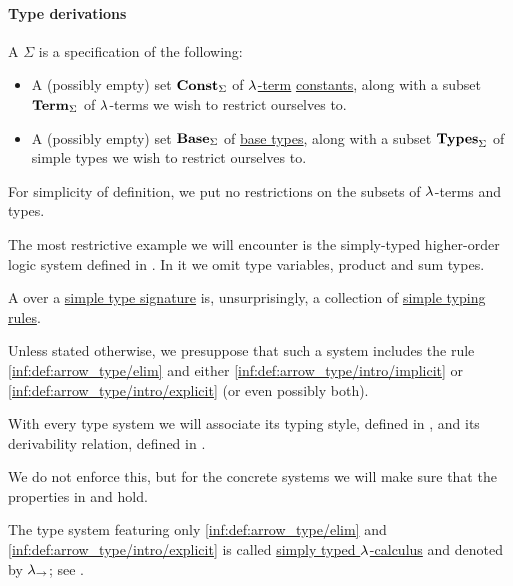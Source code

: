 \paragraph{Type derivations}

\begin{definition}\label{def:simple_type_signature}\mimprovised
  A  \( \Sigma \) is a specification of the following:
  \begin{itemize}
    \item A (possibly empty) set \( \op*{Const}_\Sigma \) of \hyperref[def:lambda_term]{\( {\mathrm \lambda} \)-term} \hyperref[def:lambda_term/const]{constants}, along with a subset \( \op*{Term}_\Sigma \) of \( {\mathrm \lambda} \)-terms we wish to restrict ourselves to.

    \item A (possibly empty) set \( \op*{Base}_\Sigma \) of \hyperref[def:simple_type]{base types}, along with a subset \( \op*{Types}_\Sigma \) of simple types we wish to restrict ourselves to.
  \end{itemize}
\end{definition}
\begin{comments}
  \item For simplicity of definition, we put no restrictions on the subsets of \( {\mathrm \lambda} \)-terms and types.
  \item The most restrictive example we will encounter is the simply-typed higher-order logic system defined in . In it we omit type variables, product and sum types.
\end{comments}

\begin{definition}\label{def:simple_type_system}\mimprovised
  A  over a \hyperref[def:simple_type_signature]{simple type signature} is, unsurprisingly, a collection of \hyperref[def:simple_typing_rule]{simple typing rules}.

  Unless stated otherwise, we presuppose that such a system includes the rule \ref{inf:def:arrow_type/elim} and either \ref{inf:def:arrow_type/intro/implicit} or \ref{inf:def:arrow_type/intro/explicit} (or even possibly both).
\end{definition}
\begin{comments}
  \item With every type system we will associate its typing style, defined in , and its derivability relation, defined in .

  \item We do not enforce this, but for the concrete systems we will make sure that the properties in  and  hold.

  \item The type system featuring only \ref{inf:def:arrow_type/elim} and \ref{inf:def:arrow_type/intro/explicit} is called \hyperref[con:simple_type_theory/arrow]{simply typed \( {\mathrm \lambda} \)-calculus} and denoted by \( {\mathrm \lambda}_{\rightarrow} \); see .
\end{comments}

